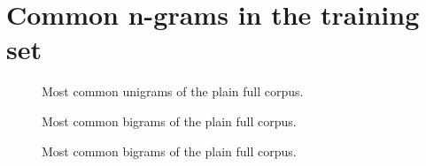 \chapter{Common n-grams in the training set}
\label{appendix:stats}

\begin{figure}[!htbp]
	  \centering
	  
	      \caption{Most common unigrams of the plain full corpus.}
	      \label{figure:commonunigrams}
\end{figure}

\begin{figure}[!htbp]
	  \centering
	  
	      \caption{Most common bigrams of the plain full corpus.}
	      \label{figure:commonbigrams}
\end{figure}

\begin{figure}[!htbp]
	  \centering
	  
	      \caption{Most common bigrams of the plain full corpus.}
	      \label{figure:commontrigrams}
\end{figure}

